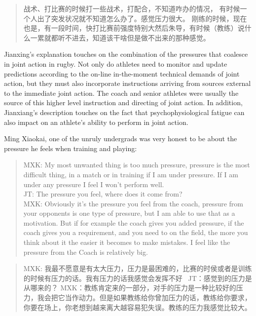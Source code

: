 \begin{CJK}{UTF8}{gbsn}
    \begin{quotation}
      战术、打比赛的时候打一些战术，打配合，不知道咋办的情况， 有时候一个人出了突发状况就不知道怎么办了。感觉压力很大。 刚练的时候，现在也是，有一段时间，快打比赛前强度特别大然后朱导，有时候（教练）说什么一累就都听不进去，知道该干啥但是做不出来的那种感觉。
    \end{quotation}

Jianxing's explanation touches on the combination of the pressures that coalesce in joint action in rugby.  Not only do athletes need to monitor and update predictions according to the on-line in-the-moment technical demands of joint action, but they must also incorporate instructions arriving from sources external to the immediate joint action.  The coach and senior athletes were usually the source of this higher level instruction and directing of joint action.  In addition, Jianxiang's description touches on the fact that psychophysiological fatigue can also impact on an athlete's ability to perform in joint action.

Ming Xiaokai, one of the unruly undergrads was very honest to be about the pressure he feels when training and playing:

    \begin{quotation}
      MXK: My most unwanted thing is too much pressure, pressure is the most difficult thing, in a match or in training if I am under pressure.  If I am under any pressure I feel I won’t perform well. \\
      JT: The pressure you feel, where does it come from? \\
      MXK: Obviously it's the pressure you feel from the coach, pressure from your opponents is one type of pressure, but I am able to use that as a motivation. But if for example the coach gives you added pressure, if the coach gives you a requirement, and you need to on the field, the more you think about it the easier it becomes to make mistakes.  I feel like the pressure from the Coach is relatively big.
    \end{quotation}

    \begin{quotation}
      MXK: 我最不愿意是有太大压力，压力是最困难的，比赛的时侯或者是训练的时候有压力的话。我有压力的话我感觉会发挥不好 
      JT：感觉到的压力是从哪来的？
      MXK：教练肯定来的一部分，对手的压力是一种比较好的压力，我会把它当作动力。但是如果教练给你曾加压力的话，教练给你要求，你要在场上，你老想到越来离大越容易犯失误。教练的压力我感觉比较大。
    \end{quotation}


\end{CJK}
